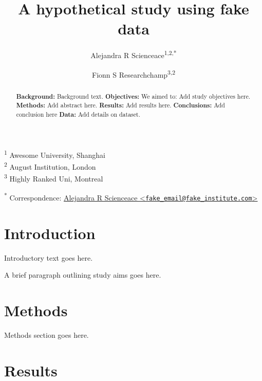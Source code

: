 \documentclass[
]{article}
\title{A hypothetical study using fake data}
\author{Alejandra R Scienceace\textsuperscript{1,2,*} \and Fionn S Researchchamp\textsuperscript{3,2}}
\date{}
\begin{document}
\maketitle
\begin{abstract}
\textbf{Background: } Background text. \newline \newline \textbf{Objectives: } We aimed to: Add study objectives here. \newline \newline \textbf{Methods: } Add abstract here. \newline \newline \textbf{Results: } Add results here. \newline \newline \textbf{Conclusions: } Add conclusion here \newline \newline \textbf{Data:} Add details on dataset.
\end{abstract}

\textsuperscript{1} Awesome University, Shanghai\\
\textsuperscript{2} August Institution, London\\
\textsuperscript{3} Highly Ranked Uni, Montreal

\textsuperscript{*} Correspondence: \href{mailto:fake_email@fake_institute.com}{Alejandra R Scienceace \textless{}\href{mailto:fake_email@fake_institute.com}{\nolinkurl{fake\_email@fake\_institute.com}}\textgreater{}}

\hypertarget{introduction}{%
\section{Introduction}\label{introduction}}

Introductory text goes here.

A brief paragraph outlining study aims goes here.

\hypertarget{methods}{%
\section{Methods}\label{methods}}

Methods section goes here.

\hypertarget{results}{%
\section{Results}\label{results}}
\end{document}
